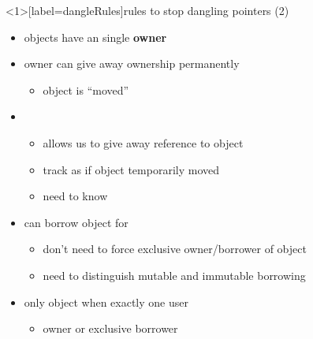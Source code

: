 \begin{frame}<1>[label=dangleRules]{rules to stop dangling pointers (2)}
    \begin{itemize}
    \item objects have an single \textbf{owner}
    \item owner can give away ownership permanently
        \begin{itemize}
        \item object is ``moved''
        \end{itemize}
    \item {}
        \begin{itemize}
        \item allows us to give away reference to object
        \item track as if object temporarily moved
        \item need to know 
        \end{itemize}
    \item can borrow object for 
        \begin{itemize}
        \item don't need to force exclusive owner/borrower of object
        \item need to distinguish mutable and immutable borrowing
        \end{itemize}
    \item only  object when exactly one user
        \begin{itemize}
        \item owner or exclusive borrower
        \end{itemize}
    \end{itemize}
\end{frame}
